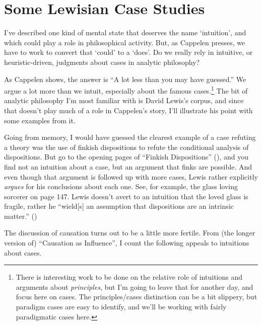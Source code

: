 \documentclass[
  10pt,
  letterpaper,
  DIV=11,
  numbers=noendperiod,
  twoside]{scrartcl}
\begin{document}
\section{Some Lewisian Case Studies}\label{sec-Lewis}

I've described one kind of mental state that deserves the name
`intuition', and which could play a role in philosophical activity. But,
as Cappelen presses, we have to work to convert that `could' to a
`does'. Do we really rely in intuitive, or heuristic-driven, judgments
about cases in analytic philosophy?

As Cappelen shows, the answer is ``A lot less than you may have
guessed.'' We argue a lot more than we intuit, especially about the
famous cases.\footnote{There is interesting work to be done on the
  relative role of intuitions and arguments about \emph{principles}, but
  I'm going to leave that for another day, and focus here on cases. The
  principles/cases distinction can be a bit slippery, but paradigm cases
  are easy to identify, and we'll be working with fairly paradigmatic
  cases here.} The bit of analytic philosophy I'm most familiar with is
David Lewis's corpus, and since that doesn't play much of a role in
Cappelen's story, I'll illustrate his point with some examples from it.

Going from memory, I would have guessed the clearest example of a case
refuting a theory was the use of finkish dispositions to refute the
conditional analysis of dispositions. But go to the opening pages of
``Finkish Dispositions'' (), and
you find not an intuition about a case, but an argument that finks are
possible. And even though that argument is followed up with more cases,
Lewis rather explicitly \emph{argues} for his conclusions about each
one. See, for example, the glass loving sorcerer on page 147. Lewis
doesn't avert to an intuition that the loved glass is fragile, rather he
``wield{[}s{]} an assumption that dispositions are an intrinsic
matter.'' ()

The discussion of causation turns out to be a little more fertile. From
(the longer version of) ``Causation as Influence'', I count the
following appeals to intuitions about cases.
\end{document}
